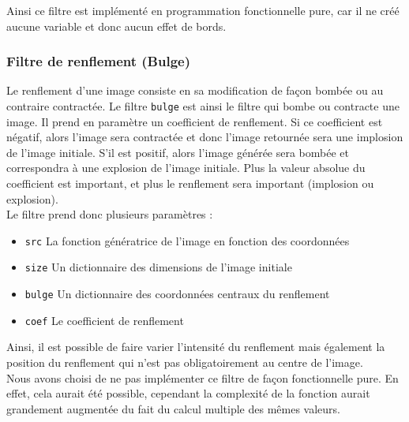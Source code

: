 \documentclass[11pt]{article}
\begin{document}
Ainsi ce filtre est implémenté en programmation fonctionnelle pure, car il ne créé aucune variable et donc aucun effet de bords.

\subsubsection{Filtre de renflement (Bulge)}

Le renflement d'une image consiste en sa modification de façon bombée ou au contraire contractée. Le filtre \texttt{bulge} est ainsi le filtre qui bombe ou contracte une image. Il prend en paramètre un coefficient de renflement. Si ce coefficient est négatif, alors l'image sera contractée et donc l'image retournée sera une implosion de l'image initiale. S'il est positif, alors l'image générée sera bombée et correspondra à une explosion de l'image initiale. Plus la valeur absolue du coefficient est important, et plus le renflement sera important (implosion ou explosion). \\

Le filtre prend donc plusieurs paramètres :
\begin{itemize}
    \item \texttt{src} La fonction génératrice de l'image en fonction des coordonnées
    \item \texttt{size} Un dictionnaire des dimensions de l'image initiale
    \item \texttt{bulge} Un dictionnaire des coordonnées centraux du renflement
    \item \texttt{coef} Le coefficient de renflement
\end{itemize}

Ainsi, il est possible de faire varier l'intensité du renflement mais également la position du renflement qui n'est pas obligatoirement au centre de l'image. \\

Nous avons choisi de ne pas implémenter ce filtre de façon fonctionnelle pure. En effet, cela aurait été possible, cependant la complexité de la fonction aurait grandement augmentée du fait du calcul multiple des mêmes valeurs.
\end{document}
